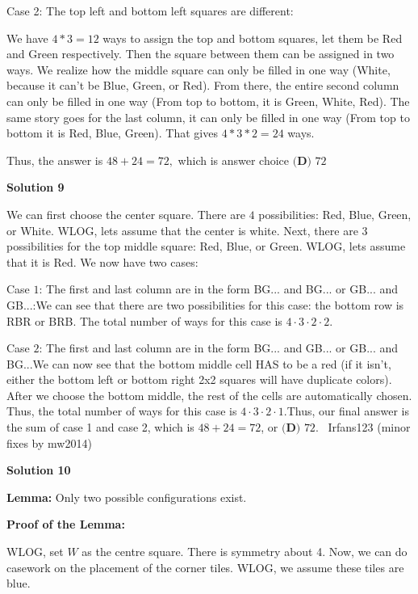 \begin{enumerate}
 Case 2: The top left and bottom left squares are different:

 We have $4 * 3 = 12$ ways to assign the top and bottom squares, let them be Red and Green respectively. Then the square between them can be assigned in two ways. We realize how the  middle square can only be filled in one way (White, because it can't be Blue, Green, or Red). From there, the entire second column can only be filled in one way (From top to bottom, it is Green, White, Red). The same story goes for the last column, it can only be filled in one way (From top to bottom it is Red, Blue, Green). That gives $4 * 3 * 2 = 24$ ways. 

 Thus, the answer is  $48+24=72,$ which is answer choice $\boxed{\textbf{(D) }72}$




\textbf{Solution 9}

We can first choose the center square. There are $4$ possibilities: Red, Blue, Green, or White. WLOG, lets assume that the center is white. Next, there are $3$ possibilities for the top middle square: Red, Blue, or Green. WLOG, lets assume that it is Red. We now have two cases:

 Case $1$: The first and last column are in the form BG... and BG... or GB... and GB...:We can see that there are two possibilities for this case: the bottom row is RBR or BRB. The total number of ways for this case is $4\cdot3\cdot2\cdot2$.

 Case $2$: The first and last column are in the form BG... and GB... or GB... and BG...We can now see that the bottom middle cell HAS to be a red (if it isn't, either the bottom left or bottom right 2x2 squares will have  duplicate colors). After we choose the bottom middle, the rest of the cells are automatically chosen. Thus, the total number of ways for this case is $4\cdot3\cdot2\cdot1$.Thus, our final answer is the sum of case 1 and case 2, which is $48 + 24 = 72$, or $\boxed{\textbf{(D) }72}$.~ Irfans123 (minor fixes by mw2014)

 



\textbf{Solution 10}

\textbf{Lemma:} Only two possible configurations exist.

 \textbf{Proof of the Lemma:}

 WLOG, set $W$ as the centre square. There is symmetry about 4. Now, we can do casework on the placement of the corner tiles. WLOG, we assume these tiles are blue.


\end{enumerate}

